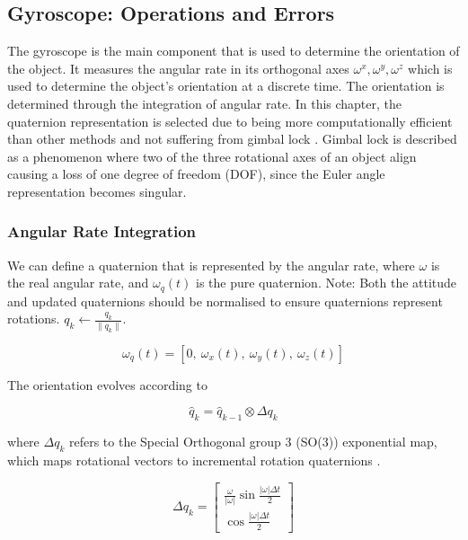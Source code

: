 \subsection{Gyroscope: Operations and Errors}
The gyroscope is the main component that is used to determine the orientation 
of the object. It measures the angular rate in its orthogonal axes $\omega^x,\omega^y,\omega^z$
which is used to determine the object's orientation at a discrete time. The orientation is 
determined through the integration of angular rate.
In this chapter, the quaternion representation is selected due to 
being more computationally efficient than other methods \cite{zhang_2011_a} and not
suffering from gimbal lock \cite{yang_2014_body}. Gimbal lock is described as a phenomenon where two of the three rotational axes of an object align causing a loss of one degree of freedom (DOF), since
the Euler angle representation becomes singular.


\subsubsection{Angular Rate Integration}
\label{sec:gyroint}
We can define a quaternion that is represented by the 
angular rate, where $\omega$ is the real angular rate, and $\omega_q(t)$ is the pure quaternion. 
Note: Both the attitude and updated quaternions should be normalised to ensure quaternions represent rotations.
$q_k \leftarrow \frac{q_k}{\|q_k\|}$.

\begin{equation}
\omega_q(t) = [0,\ \omega_x(t),\ \omega_y(t),\ \omega_z(t)]
\end{equation}

The orientation evolves according to \cite{yang_2014_body}

\begin{equation}
\hat{q}_k = \hat{q}_{k-1} \otimes \Delta q_k
\end{equation}

where $\Delta q_k$ refers to the Special Orthogonal group 3 (SO(3)) exponential map, which maps rotational vectors to incremental rotation quaternions \cite{yang_2014_body}.

\begin{equation}
\Delta q_k = \begin{bmatrix}
    \frac{\omega}{|\omega|} \sin{\frac{|\omega| \Delta t}{2}} \\
    \cos{\frac{|\omega| \Delta t}{2}}
    \end{bmatrix}
\end{equation}


